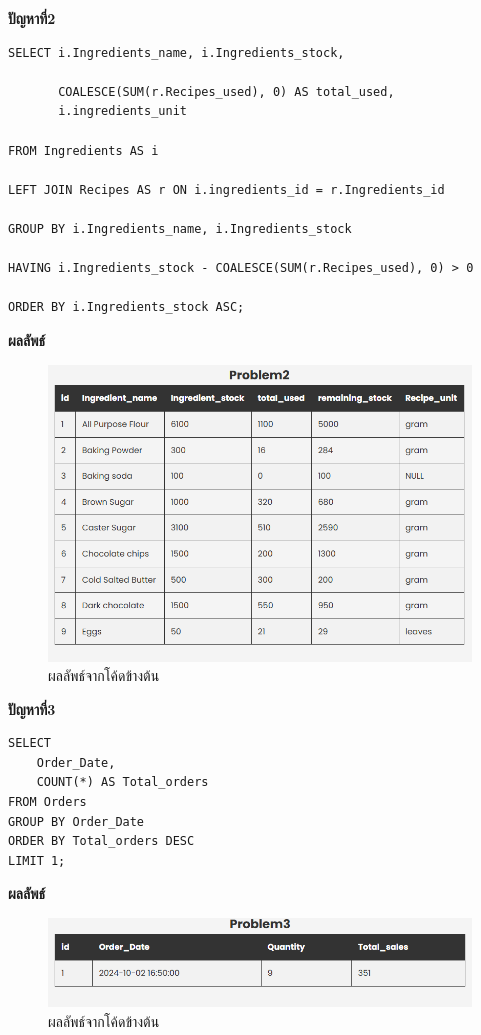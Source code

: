 \documentclass{report}
\begin{document}
\pagebreak\textbf{ปัญหาที่2} 
\begin{verbatim}
SELECT i.Ingredients_name, i.Ingredients_stock,
 
       COALESCE(SUM(r.Recipes_used), 0) AS total_used,
	   i.ingredients_unit
 
FROM Ingredients AS i
 
LEFT JOIN Recipes AS r ON i.ingredients_id = r.Ingredients_id
 
GROUP BY i.Ingredients_name, i.Ingredients_stock
 
HAVING i.Ingredients_stock - COALESCE(SUM(r.Recipes_used), 0) > 0
 
ORDER BY i.Ingredients_stock ASC;
\end{verbatim}
\textbf{ผลลัพธ์}
\raggedright\begin{figure}[!ht]
    \centering
    \includegraphics[scale=0.55]{q2.png}
    \caption{ผลลัพธ์จากโค้ดข้างต้น} 
\label{fig:mesh2}
\end{figure} 


\par
\pagebreak\textbf{ปัญหาที่3} 
\begin{verbatim}
SELECT
    Order_Date,
    COUNT(*) AS Total_orders
FROM Orders
GROUP BY Order_Date
ORDER BY Total_orders DESC
LIMIT 1;
\end{verbatim}
\textbf{ผลลัพธ์}
\raggedright\begin{figure}[!ht]
    \centering
    \includegraphics[scale=0.55]{q3.png}
    \caption{ผลลัพธ์จากโค้ดข้างต้น} 
\label{fig:mesh2}
\end{figure}
\end{document}
